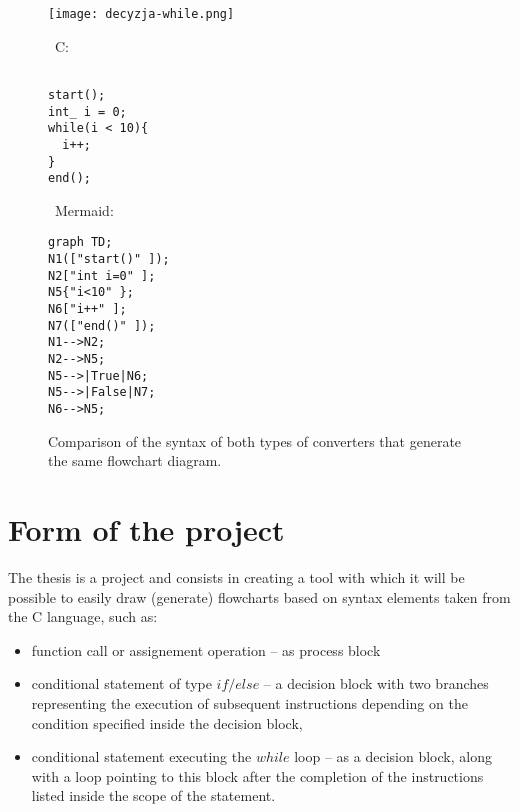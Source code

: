 \begin{figure}[h]
    \centering
\begin{minipage}[b]{.33\textwidth}
    \centering
   \texttt{[image: decyzja-while.png]}
\end{minipage}%
\hfill\vline\hfill
\hspace{0.02\linewidth}
\begin{minipage}[b]{0.3\textwidth}
    \centering 
\strut\vspace*{-\baselineskip}\newline\
C:
\begin{verbatim}
  
start();
int_ i = 0;
while(i < 10){
  i++;
}
end();
  \end{verbatim}
\end{minipage}%
\hfill\vline\hfill
\hspace{0.02\linewidth}
\begin{minipage}[b]{0.3\textwidth}
    \centering
    \strut\vspace*{-\baselineskip}\newline\
    Mermaid:
  	\begin{verbatim}
graph TD;
N1(["start()" ]);
N2["int i=0" ];
N5{"i<10" };
N6["i++" ];
N7(["end()" ]);
N1-->N2;
N2-->N5;
N5-->|True|N6;
N5-->|False|N7;
N6-->N5;
  	\end{verbatim}

    \end{minipage}
    \label{fig:prob3}
    \caption{Comparison of the syntax of both types of converters that generate the same flowchart diagram.}
\end{figure}
	

	
\section{Form of the project}
The thesis is a project and consists in creating a tool with which it will be possible to easily draw (generate) flowcharts based on syntax elements taken from the C language, such as:

\begin{itemize}
	\item {
		function call or assignement operation -- as process block
	}
	\item conditional statement of type $if / else$ -- a decision block with two branches representing the execution of subsequent instructions depending on the condition specified inside the decision block,
	\item  conditional statement executing the $while$ loop -- as a decision block, along with a loop pointing to this block after the completion of the instructions listed inside the scope of the statement.
\end{itemize}

